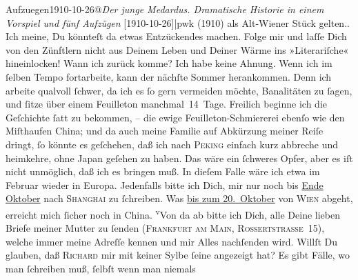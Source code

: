 \begin{ledgroupsized}[t]{13cm}
{{{{                  Aufzuegen1910-10-26@\strich\emph{Der junge Medardus. Dramatische Historie in einem Vorspiel und fünf Aufzügen} {[}1910-10-26{]}|pwk} (1910) als
                     Alt-Wiener Stück gelten.}}}\label{K_L02854-6h}. Ich meine,
               Du könnteſt da etwas Entzückendes machen. Folge mir und laſſe Dich von den Zünftlern
               nicht aus Deinem Leben und Deiner Wärme ins »Literariſche« hineinlocken!\pend
           \pstart
           {\pb}Wann ich zurück komme? Ich habe keine Ahnung. Wenn
               ich im ſelben Tempo fortarbeite, kann der nächſte Sommer herankommen. Denn ich
               arbeite qualvoll ſchwer, da ich es ſo gern vermeiden möchte, Banalitäten zu ſagen,
               und ſitze über einem Feuilleton manchmal 14 Tage. Freilich beginne ich die Geſchichte
               ſatt zu bekommen, – die ewige Feuilleton-Schmiererei ebenſo wie den Miſthaufen China; und da  auch meine Familie auf Abkürzung meiner Reiſe {\pb}dringt, ſo könnte es geſchehen, daß ich nach \textsc{Peking} einfach kurz abbreche und heimkehre, ohne Japan geſehen zu haben. Das wäre ein ſchweres Opfer, aber es iſt nicht
               unmöglich, daß ich es bringen muß. In dieſem Falle wäre ich etwa im Februar wieder in Europa. Jedenfalls bitte ich Dich, mir nur noch bis \uline{Ende Oktober} nach \textsc{Shanghai} zu ſchreiben. Was \uline{bis zum 20. Oktober} von \textsc{Wien} abgeht, erreicht mich ſicher noch in China. {\pb}\substVorne{}\textsuperscript{v}\substDazwischen{}V\substHinten{}on da ab bitte ich Dich, alle Deine 
               lieben Briefe meiner Mutter
               zu ſenden (\textsc{Frankfurt am Main,  Rossertstraſse 15}), welche  immer meine
               Adreſſe kennen und mir Alles nachſenden wird.\pend
           \pstart
           Willſt Du glauben, daß \textsc{Richard} mir mit keiner Sylbe ſeine \label{K_L02854-7v}\label{K_L02854-7h} angezeigt hat? Es gibt Fälle, wo man ſchreiben muß, ſelbſt wenn man niemals

\end{ledgroupsized}
